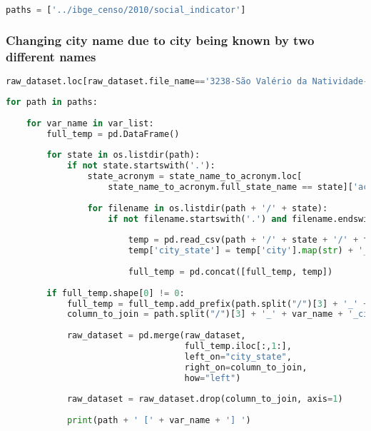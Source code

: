 \begin{lstlisting}[language=Python]
paths = ['../ibge_censo/2010/social_indicator']
\end{lstlisting}

\hypertarget{changing-city-name-due-to-city-being-known-by-two-different-names}{%
\subsubsection{Changing city name due to city being known by two
different
names}\label{changing-city-name-due-to-city-being-known-by-two-different-names}}

\begin{lstlisting}[language=Python]
raw_dataset.loc[raw_dataset.file_name=='3238-São Valério da Natividade-TO.pdf', 'city_state'] = 'sao valerio_to'
\end{lstlisting}

\begin{lstlisting}[language=Python]
for path in paths:
    
    for var_name in var_list:
        full_temp = pd.DataFrame()
        
        for state in os.listdir(path):
            if not state.startswith('.'):
                state_acronym = state_name_to_acronym.loc[
                    state_name_to_acronym.full_state_name == state]['acronym'].values[0]
                
                for filename in os.listdir(path + '/' + state):
                    if not filename.startswith('.') and filename.endswith(var_name + '.csv'):
                        
                        temp = pd.read_csv(path + '/' + state + '/' + filename)
                        temp['city_state'] = temp['city'].map(str) + '_' + state_acronym
                        
                        full_temp = pd.concat([full_temp, temp])
                        
        if full_temp.shape[0] != 0:
            full_temp = full_temp.add_prefix(path.split("/")[3] + '_' + var_name + '_')
            column_to_join = path.split("/")[3] + '_' + var_name + '_city_state'
            
            raw_dataset = pd.merge(raw_dataset,
                                   full_temp.iloc[:,1:],
                                   left_on="city_state",
                                   right_on=column_to_join,
                                   how="left")
            
            raw_dataset = raw_dataset.drop(column_to_join, axis=1)
            
            print(path + ' [' + var_name + '] ')
\end{lstlisting}

